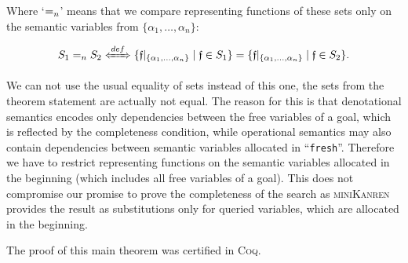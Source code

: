 Where `$=_n$' means that we compare representing functions of these sets only on the semantic variables from $\{\alpha_1, \dots, \alpha_n\}$:

\[
S_1 \eqrestr S_2 \xLeftrightarrow{def}  \{\mathfrak{f}|_{\{\alpha_1,\dots,\alpha_n\}} \mid \mathfrak{f} \in S_1 \} = \{\mathfrak{f}|_{\{\alpha_1,\dots,\alpha_n\}} \mid \mathfrak{f} \in S_2 \}.
\]

We can not use the usual equality of sets instead of this one, the sets from the theorem statement are actually not equal.
The reason for this is that denotational semantics encodes only dependencies between the free variables of a goal, which is reflected by the completeness condition, while
operational semantics may also contain dependencies between semantic variables allocated in ``\lstinline|fresh|''.
Therefore we have to restrict representing functions on the semantic variables allocated in the beginning (which includes all free variables of a goal). This does not
compromise our promise to prove the completeness of the search as \textsc{miniKanren} provides the result as substitutions only for queried variables,
which are allocated in the beginning.

The proof of this main theorem was certified in \textsc{Coq}.